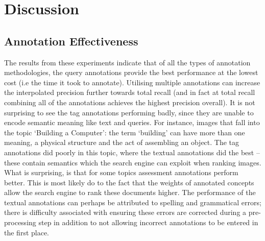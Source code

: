 \chapter{Discussion}

\section{Annotation Effectiveness}

The results from these experiments indicate that of all the types of annotation methodologies, the query annotations provide the best performance at the lowest cost (i.e the time it took to annotate). Utilising multiple annotations can increase the interpolated precision further towards total recall (and in fact at total recall combining all of the annotations achieves the highest precision overall). It is not surprising to see the tag annotations performing badly, since they are unable to encode semantic meaning like text and queries. For instance, images that fall into the topic `Building a Computer': the term `building' can have more than one meaning, a physical structure and the act of assembling an object. The tag annotations did poorly in this topic, where the textual annotations did the best -- these contain semantics which the search engine can exploit when ranking images.  What is surprising, is that for some topics assessment annotations perform better. This is most likely do to the fact that the weights of annotated concepts allow the search engine to rank these documents higher. The performance of the textual annotations can perhaps be attributed to spelling and grammatical errors; there is difficulty associated with ensuring these errors are corrected during a pre-processing step in addition to not allowing incorrect annotations to be entered in the first place.

